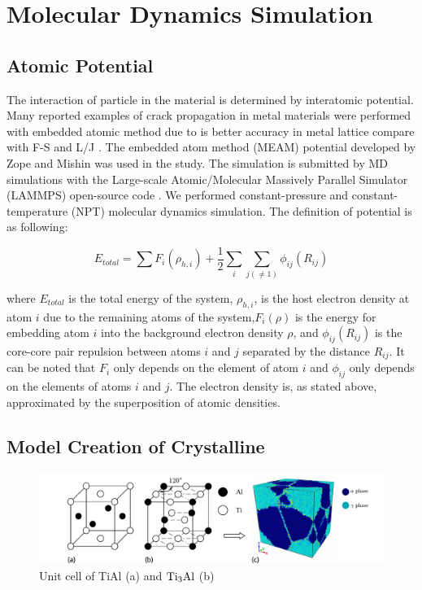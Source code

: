 \documentclass[metals,article,submit,moreauthors,pdftex,10pt,a4paper]{Definitions/mdpi}
\begin{document}
\section{Molecular Dynamics Simulation }\label{section:method}
\subsection{Atomic Potential}

The interaction of particle in the material is determined by interatomic potential. Many reported examples of crack propagation in metal materials were performed with embedded atomic method due to is better accuracy in metal lattice compare with F-S and L/J \cite{Ko2015}. The embedded atom method (MEAM) potential developed by Zope and Mishin \cite{Zope2003} was used in the study. The simulation is submitted by MD simulations with the Large-scale Atomic/Molecular Massively Parallel Simulator (LAMMPS) open-source code \cite{Plimpton1995}. We performed constant-pressure and constant-temperature (NPT) molecular dynamics simulation. The definition of potential is as following:
	
\begin{equation} \label{eq:eam} 
E_{total}= \displaystyle\sum F_i(\rho_{h,i})+\frac{1}{2}\sum_i\sum_{j(\neq1)}\phi_{ij}(R_{ij})
\end{equation}
	
where $E_{total}$ is the total energy of the system, $\rho_{h,i}$, is the host electron density at atom $i$ due to the remaining atoms of the system,$F_i(\rho)$ is the energy for embedding atom $i$ into the background electron density $\rho$, and $\phi_{ij}(R_{ij})$ is the core-core pair repulsion between atoms $i$ and $j$ separated by the distance $R_{ij}$. It can be noted that $F_i$ only depends on the element of atom $i$ and $\phi_{ij}$ only depends on the elements of atoms $i$ and $j$. The electron density is, as stated above, approximated by the superposition of atomic densities.
	
%	
\subsection{Model Creation of Crystalline}
\begin{figure}[ht]
	\centering
	\includegraphics[width=1\linewidth]{img/tial-cell2}
	\caption{Unit cell of \rm{TiAl} (a) and $\rm{Ti_3Al}$ (b)}
	\label{fig:tial-cell}
\end{figure}
\end{document}
